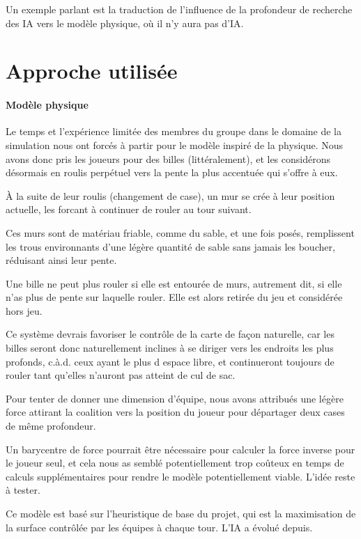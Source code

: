 		Un exemple parlant est la traduction de l'influence de la profondeur de recherche des IA vers le modèle physique, où il n'y aura pas d'IA.
	
	\section{Approche utilisée}
	
		\paragraph{Modèle physique}
		Le temps et l'expérience limitée des membres du groupe dans le domaine de la simulation nous ont forcés à partir pour le modèle inspiré de la physique.
		Nous avons donc pris les joueurs pour des billes (littéralement), et les considérons désormais en roulis perpétuel vers la pente la plus accentuée qui s'offre à eux.
		
		À la suite de leur roulis (changement de case), un mur se crée à leur position actuelle, les forcant à continuer de rouler au tour suivant.
		
		Ces murs sont de matériau friable, comme du sable, et une fois posés, remplissent les trous environnants d'une légère quantité de sable sans jamais les boucher, réduisant ainsi leur pente.
		
		Une bille ne peut plus rouler si elle est entourée de murs, autrement dit, si elle n'as plus de pente sur laquelle rouler.
		Elle est alors retirée du jeu et considérée hors jeu.
		
		Ce système devrais favoriser le contrôle de la carte de façon naturelle, car les billes seront donc naturellement inclines à se diriger vers les endroits les plus profonds, c.à.d. ceux ayant le plus d espace libre, et continueront toujours de rouler tant qu'elles n'auront pas atteint de cul de sac.
		
		Pour tenter de donner une dimension d'équipe, nous avons attribués une légère force attirant la coalition vers la position du joueur pour départager deux cases de même profondeur.
		
		Un barycentre de force pourrait être nécessaire pour calculer la force inverse pour le joueur seul, et cela nous as semblé potentiellement trop coûteux en temps de calculs supplémentaires pour rendre le modèle potentiellement viable.
		L'idée reste à tester.
		

		\begin{info}
			Ce modèle est basé sur l'heuristique de base du projet, qui est la maximisation de la surface contrôlée par les équipes à chaque tour. L'IA a évolué depuis.
		\end{info}
		
